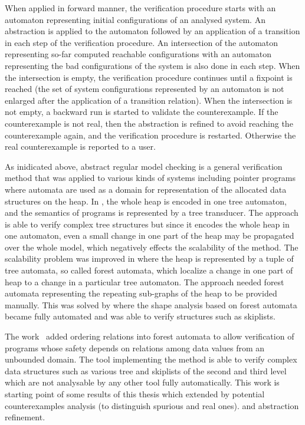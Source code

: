 	  When applied in forward manner, the verification procedure starts with an automaton representing
	  initial configurations of an analysed system.
	  An abstraction is applied to the automaton followed by an application
	  of a transition in each step of the verification procedure.
	  An intersection of the automaton representing so-far computed reachable configurations with an automaton representing
	  the bad configurations of the system is also done in each step.
	  When the intersection is empty, the verification procedure continues
	  until a fixpoint is reached (the set of system configurations represented by an automaton
	  is not enlarged after the application of a transition relation).
	  When the intersection is not empty, a backward run is started to validate the counterexample.
	  If the counterexample is not real, then the abstraction is refined to avoid reaching
	  the counterexample again, and the verification procedure is restarted.
	  Otherwise the real counterexample is reported to a user.

	  As inidicated above, abstract regular model checking is a general verification method that was applied to various kinds of systems
	  including pointer programs \cite{bhrv06b, forester11, boxes13} where automata are used as a domain
	  for representation of the allocated data structures on the heap.
	  In \cite{bhrv06b}, the whole heap is encoded in one tree automaton, and the semantics of
	  programs is represented by a tree transducer.
	  The approach is able to verify complex tree structures but since it encodes the whole
	  heap in one automaton, even a small change in one part of the heap may
	  be propagated over the whole model, which negatively effects the scalability of the method.
	  The scalability problem was improved in \cite{forester11} where the heap is represented by a tuple of 
	  tree automata, so called forest automata, which localize a change in one part of heap
	  to a change in a particular tree automaton.
	  The approach needed forest automata representing the repeating sub-graphs of the heap
	  to be provided manually.
	  This was solved by \cite{boxes13} where the shape analysis based on forest automata became
	  fully automated and was able to verify structures such as skiplists.

          The work~\cite{forester-data-acta} added ordering relations into forest
          automata to allow verification of programs whose safety depends on relations among data values
          from an unbounded domain.
	  The \forester{} tool implementing the method is able to verify complex data structures
	  such as various tree and skiplists of the second and third level \cite{boxes13} which
	  are not analysable by any other tool fully automatically.
          This work is starting point of some results of this thesis which extended \cite{boxes13} by potential
          counterexamples analysis (to distinguish spurious and real ones). and abstraction refinement.

